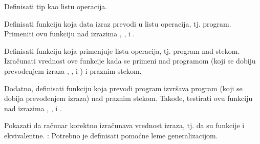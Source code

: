 \begin{isabellebody}
\begin{exercise}[subtitle=stek mašina.]
\begin{isamarkuptext}
Definisati tip  kao listu operacija.%
\end{isamarkuptext}\isamarkuptrue%
%
\begin{isamarkuptext}%
Definisati funkciju  koja
      data izraz prevodi u listu operacija, tj. program.
      Primeniti ovu funkciju nad izrazima , , i .%
\end{isamarkuptext}\isamarkuptrue%
%
\begin{isamarkuptext}%
Definisati funkciju 
      koja primenjuje listu operacija, tj. program nad stekom.
      Izračunati vrednost ove funkcije kada se primeni nad
      programom (koji se dobiju prevođenjem izraza , , i )
      i praznim stekom.%
\end{isamarkuptext}\isamarkuptrue%
%
\begin{isamarkuptext}%
Dodatno, definisati funkciju  koja
      prevodi program izvršava program (koji se dobija prevođenjem izraza)
      nad praznim stekom. Takođe, testirati ovu funkciju nad izrazima
      , , i .%
\end{isamarkuptext}\isamarkuptrue%
%
\begin{isamarkuptext}%
Pokazati da računar korektno izračunava vrednost izraza, tj. da su
      funkcije  i  ekvivalentne.
      : Potrebno je definisati pomoćne leme generalizacijom.%
\end{isamarkuptext}\isamarkuptrue%
%
\end{exercise}
%
\isadelimtheory
%
\endisadelimtheory
%
\isatagtheory
%
\endisatagtheory
{\isafoldtheory}%
%
\isadelimtheory
%
\endisadelimtheory
%
\end{isabellebody}%
\endinput
